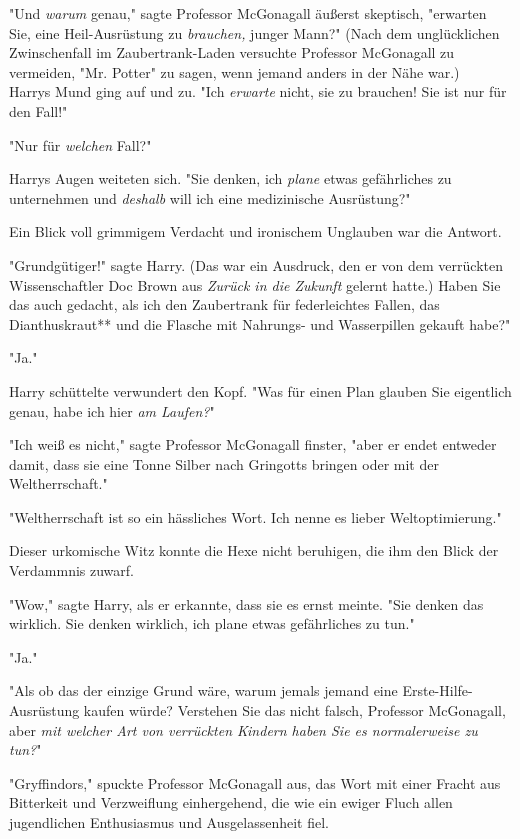 {"Und \emph{warum} genau," sagte Professor McGonagall äußerst skeptisch, "erwarten Sie, eine Heil-Ausrüstung zu \emph{brauchen,} junger Mann?" (Nach dem unglücklichen Zwinschenfall im Zaubertrank-Laden versuchte Professor McGonagall zu vermeiden, "Mr. Potter" zu sagen, wenn jemand anders in der Nähe war.)\\ Harrys Mund ging auf und zu. "Ich \emph{erwarte} nicht, sie zu brauchen! Sie ist nur für den Fall!"

"Nur für \emph{welchen} Fall?"

Harrys Augen weiteten sich. "Sie denken, ich \emph{plane} etwas gefährliches zu unternehmen und \emph{deshalb} will ich eine medizinische Ausrüstung?"

Ein Blick voll grimmigem Verdacht und ironischem Unglauben war die Antwort.

"Grundgütiger!" sagte Harry. (Das war ein Ausdruck, den er von dem verrückten Wissenschaftler Doc Brown aus \emph{Zurück in die Zukunft} gelernt hatte.) Haben Sie das auch gedacht, als ich den Zaubertrank für federleichtes Fallen, das Dianthuskraut** und die Flasche mit Nahrungs- und Wasserpillen gekauft habe?"

"Ja."

Harry schüttelte verwundert den Kopf. "Was für einen Plan glauben Sie eigentlich genau, habe ich hier \emph{am Laufen?}"

"Ich weiß es nicht," sagte Professor McGonagall finster, "aber er endet entweder damit, dass sie eine Tonne Silber nach Gringotts bringen oder mit der Weltherrschaft."

"Weltherrschaft ist so ein hässliches Wort. Ich nenne es lieber Weltoptimierung."

Dieser urkomische Witz konnte die Hexe nicht beruhigen, die ihm den Blick der Verdammnis zuwarf.

"Wow," sagte Harry, als er erkannte, dass sie es ernst meinte. "Sie denken das wirklich. Sie denken wirklich, ich plane etwas gefährliches zu tun."

"Ja."

"Als ob das der einzige Grund wäre, warum jemals jemand eine Erste-Hilfe-Ausrüstung kaufen würde? Verstehen Sie das nicht falsch, Professor McGonagall, aber \emph{mit welcher Art von verrückten Kindern haben Sie es normalerweise zu tun?}"

"Gryffindors," spuckte Professor McGonagall aus, das Wort mit einer Fracht aus Bitterkeit und Verzweiflung einhergehend, die wie ein ewiger Fluch allen jugendlichen Enthusiasmus und Ausgelassenheit fiel.

}
